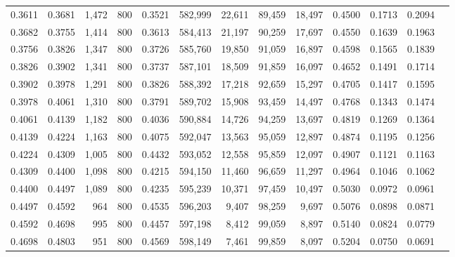\begin{tabular}{rrrrrrrrrrrrr}
0.3611 & 0.3681 &  1,472 &   800 &                                     0.3521 & 582,999 &  22,611 &  89,459 &  18,497 & 0.4500 & 0.1713 & 0.2094 \\
0.3682 & 0.3755 &  1,414 &   800 &                                     0.3613 & 584,413 &  21,197 &  90,259 &  17,697 & 0.4550 & 0.1639 & 0.1963 \\
0.3756 & 0.3826 &  1,347 &   800 &                                     0.3726 & 585,760 &  19,850 &  91,059 &  16,897 & 0.4598 & 0.1565 & 0.1839 \\
0.3826 & 0.3902 &  1,341 &   800 &                                     0.3737 & 587,101 &  18,509 &  91,859 &  16,097 & 0.4652 & 0.1491 & 0.1714 \\
0.3902 & 0.3978 &  1,291 &   800 &                                     0.3826 & 588,392 &  17,218 &  92,659 &  15,297 & 0.4705 & 0.1417 & 0.1595 \\
0.3978 & 0.4061 &  1,310 &   800 &                                     0.3791 & 589,702 &  15,908 &  93,459 &  14,497 & 0.4768 & 0.1343 & 0.1474 \\
0.4061 & 0.4139 &  1,182 &   800 &                                     0.4036 & 590,884 &  14,726 &  94,259 &  13,697 & 0.4819 & 0.1269 & 0.1364 \\
0.4139 & 0.4224 &  1,163 &   800 &                                     0.4075 & 592,047 &  13,563 &  95,059 &  12,897 & 0.4874 & 0.1195 & 0.1256 \\
0.4224 & 0.4309 &  1,005 &   800 &                                     0.4432 & 593,052 &  12,558 &  95,859 &  12,097 & 0.4907 & 0.1121 & 0.1163 \\
0.4309 & 0.4400 &  1,098 &   800 &                                     0.4215 & 594,150 &  11,460 &  96,659 &  11,297 & 0.4964 & 0.1046 & 0.1062 \\
0.4400 & 0.4497 &  1,089 &   800 &                                     0.4235 & 595,239 &  10,371 &  97,459 &  10,497 & 0.5030 & 0.0972 & 0.0961 \\
0.4497 & 0.4592 &    964 &   800 &                                     0.4535 & 596,203 &   9,407 &  98,259 &   9,697 & 0.5076 & 0.0898 & 0.0871 \\
0.4592 & 0.4698 &    995 &   800 &                                     0.4457 & 597,198 &   8,412 &  99,059 &   8,897 & 0.5140 & 0.0824 & 0.0779 \\
0.4698 & 0.4803 &    951 &   800 &                                     0.4569 & 598,149 &   7,461 &  99,859 &   8,097 & 0.5204 & 0.0750 & 0.0691 \\

\end{tabular}
